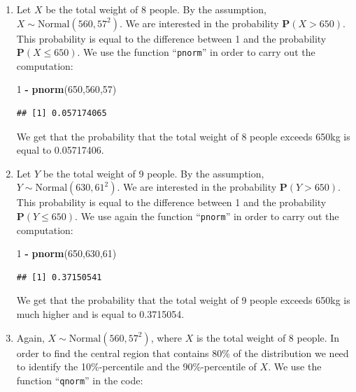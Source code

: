 \documentclass[]{krantz}
\makeatletter
\newenvironment{Shaded}{\begin{snugshade}}{\end{snugshade}}
\newcommand{\DecValTok}[1]{\textcolor[rgb]{0.00,0.00,0.81}{#1}}
\newcommand{\KeywordTok}[1]{\textcolor[rgb]{0.13,0.29,0.53}{\textbf{#1}}}
\newcommand{\NormalTok}[1]{#1}
\newcommand{\OperatorTok}[1]{\textcolor[rgb]{0.81,0.36,0.00}{\textbf{#1}}}
\newcommand{\StringTok}[1]{\textcolor[rgb]{0.31,0.60,0.02}{#1}}
\newcommand{\Prob}{\mathbf{P}}
\newenvironment{kframe}{%
\medskip{}
\setlength{\fboxsep}{.8em}
 \def\at@end@of@kframe{}%
 \ifinner\ifhmode%
  \def\at@end@of@kframe{\end{minipage}}%
  \begin{minipage}{\columnwidth}%
 \fi\fi%
 \def\FrameCommand##1{\hskip\@totalleftmargin \hskip-\fboxsep
 \colorbox{shadecolor}{##1}\hskip-\fboxsep
     \hskip-\linewidth \hskip-\@totalleftmargin \hskip\columnwidth}%
 \MakeFramed {\advance\hsize-\width
   \@totalleftmargin\z@ \linewidth\hsize
   \@setminipage}}%
 {\par\unskip\endMakeFramed%
 \at@end@of@kframe}
\renewenvironment{Shaded}{\begin{kframe}}{\end{kframe}}
\theoremstyle{definition}
\theoremstyle{definition}
\theoremstyle{definition}
\theoremstyle{remark}
\makeatother
\begin{document}
\begin{enumerate}
\def\labelenumi{\arabic{enumi}.}
\item
  Let \(X\) be the total weight of 8
  people. By the assumption, \(X \sim \mbox{Normal}(560, 57^2)\). We are
  interested in the probability \(\Prob(X > 650)\). This probability is
  equal to the difference between 1 and the probability
  \(\Prob(X \leq 650)\). We use the function ``\texttt{pnorm}'' in order to carry out
  the computation:

\begin{Shaded}
\begin{Highlighting}[]
\DecValTok{1} \OperatorTok{-}\StringTok{ }\KeywordTok{pnorm}\NormalTok{(}\DecValTok{650}\NormalTok{,}\DecValTok{560}\NormalTok{,}\DecValTok{57}\NormalTok{)}
\end{Highlighting}
\end{Shaded}

\begin{verbatim}
## [1] 0.057174065
\end{verbatim}

  We get that the probability that the total weight of 8 people exceeds
  650kg is equal to 0.05717406.
\item
  Let \(Y\) be the total weight of 9
  people. By the assumption, \(Y \sim \mbox{Normal}(630, 61^2)\). We are
  interested in the probability \(\Prob(Y > 650)\). This probability is
  equal to the difference between 1 and the probability
  \(\Prob(Y \leq 650)\). We use again the function ``\texttt{pnorm}'' in order to
  carry out the computation:

\begin{Shaded}
\begin{Highlighting}[]
\DecValTok{1} \OperatorTok{-}\StringTok{ }\KeywordTok{pnorm}\NormalTok{(}\DecValTok{650}\NormalTok{,}\DecValTok{630}\NormalTok{,}\DecValTok{61}\NormalTok{)}
\end{Highlighting}
\end{Shaded}

\begin{verbatim}
## [1] 0.37150541
\end{verbatim}

  We get that the probability that the total weight of 9 people exceeds
  650kg is much higher and is equal to 0.3715054.
\item
  Again,
  \(X \sim \mbox{Normal}(560, 57^2)\), where \(X\) is the total weight of 8
  people. In order to find the central region that contains 80\% of the
  distribution we need to identify the 10\%-percentile and the
  90\%-percentile of \(X\). We use the function ``\texttt{qnorm}'' in the code:


\end{enumerate}
\end{document}
